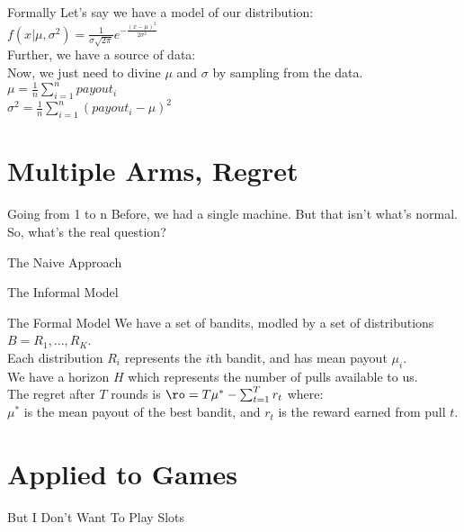 \documentclass{powerdot}
\begin{document}
\begin{slide}{Formally}
  Let's say we have a model of our distribution:\\
  $ f(x | \mu, \sigma^2)= \frac{1}{\sigma \sqrt{2\pi}} e^{-
    \frac{(x-\mu)^2}{2\sigma^2}}$\\
  Further, we have a source of data:\\ %

  Now, we just need to divine $\mu$ and $\sigma$ by sampling from the data.\\ %

  $\mu = \frac{1}{n} \sum_{i=1}^{n} payout_i$\\
  $\sigma^2 = \frac{1}{n} \sum_{i=1}^{n} (payout_i - \mu)^2$
\end{slide}

\section{Multiple Arms, Regret}
\begin{slide}{Going from 1 to n}
  Before, we had a single machine.
  But that isn't what's normal.
  So, what's the real question?
\end{slide}

\begin{slide}{The Naive Approach}
\end{slide}

\begin{slide}{The Informal Model}
\end{slide}

\begin{slide}{The Formal Model}
  We have a set of bandits, modled by a set of distributions $B = {R_1, ..., R_K}$.\\
  Each distribution $R_i$ represents the $i$th bandit, and has mean payout $\mu_i$.\\
  We have a horizon $H$ which represents the number of pulls available to us.\\
  The regret after $T$ rounds is $\ro = T\mu^* - \sum_{t=1}^{T}r_t$ where:\\
  $\mu^*$ is the mean payout of the best bandit, and $r_t$ is the reward earned
  from pull $t$.
\end{slide}

\section{Applied to Games}
\begin{slide}{But I Don't Want To Play Slots}
\end{slide}
\end{document}
